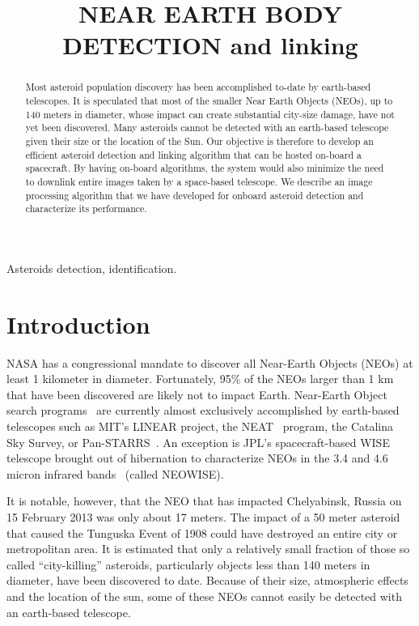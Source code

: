 \documentclass{article}
\title{NEAR EARTH BODY DETECTION and linking}
\begin{document}
%
\maketitle
%
\begin{abstract}
Most asteroid population discovery has been accomplished to-date by earth-based telescopes. It is speculated that most of the smaller Near Earth Objects (NEOs), up to 140 meters in diameter, whose impact can create substantial city-size damage, have not yet been discovered.  Many asteroids  cannot be detected with an earth-based telescope given their size or the location of the Sun.  Our objective is therefore to develop an efficient asteroid detection and linking algorithm that can be hosted on-board a spacecraft.  By having on-board algorithms, the system would also minimize the need to downlink entire images taken by a space-based telescope. We describe an image processing algorithm that we have developed for onboard asteroid detection and characterize its performance.
 
\end{abstract}
%
\begin{keywords}
Asteroids detection, identification. 
\end{keywords}
%
\section{Introduction}
\label{sec:intro}

NASA has a congressional mandate to discover all Near-Earth Objects (NEOs) at least 1 kilometer in diameter.  Fortunately, 95\% of the NEOs larger than 1 km that have been discovered are likely not to impact Earth.  
Near-Earth Object search programs~\cite{stokes2002near} are currently almost exclusively accomplished by earth-based telescopes such as MIT's LINEAR \cite{evans2003detection}  project, the NEAT~\cite{neat2014} program, the Catalina Sky Survey, or  Pan-STARRS~\cite{denneau2013pan}.  An exception is JPL's spacecraft-based WISE telescope brought out of hibernation to characterize NEOs in the 3.4 and 4.6 micron infrared bands~\cite{wise2014} (called NEOWISE). 

It is notable, however, that the NEO that has impacted Chelyabinsk, Russia on 15 February 2013 was only about 17 meters.  The impact of a 50 meter asteroid that caused the Tunguska Event of 1908 could have destroyed an entire city or metropolitan area. It is estimated that only a relatively small fraction of those so called ``city-killing'' asteroids, particularly objects less than 140 meters in diameter, have been discovered to date. Because of their size, atmospheric effects and the location of the sun, some of these NEOs cannot easily be detected with an earth-based telescope.  
\end{document}

